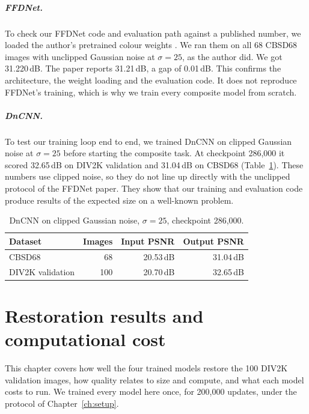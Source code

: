 \documentclass[12pt,a4paper,oneside]{NITR}
\newcommand{\dB}{\,dB}
\begin{document}
\paragraph{FFDNet.} To check our FFDNet code and evaluation path against a
published number, we loaded the author's pretrained colour weights
\cite{kair}. We ran them on all 68 CBSD68 images \cite{martin2001bsd} with
unclipped Gaussian noise at $\sigma=25$, as the author did. We got
31.220\dB{}. The paper \cite{zhang2018ffdnet} reports 31.21\dB{}, a gap of
0.01\dB{}. This confirms the architecture, the weight loading and the
evaluation code. It does not reproduce FFDNet's training, which is why we
train every composite model from scratch.

\paragraph{DnCNN.} To test our training loop end to end, we trained DnCNN on
clipped Gaussian noise at $\sigma=25$ before starting the composite task. At
checkpoint 286,000 it scored 32.65\dB{} on DIV2K validation and 31.04\dB{} on
CBSD68 (Table~\ref{tab:gaussian}). These numbers use clipped noise, so they
do not line up directly with the unclipped protocol of the FFDNet paper. They
show that our training and evaluation code produce results of the expected
size on a well-known problem.

\begin{table}[htbp]
	\centering
	\caption{DnCNN on clipped Gaussian noise, $\sigma=25$, checkpoint 286,000.}
	\label{tab:gaussian}
	\begin{tabular}{@{}lrrr@{}}
		\toprule
		Dataset & Images & Input PSNR & Output PSNR \\
		\midrule
		CBSD68           & 68  & 20.53\dB & 31.04\dB \\
		DIV2K validation & 100 & 20.70\dB & 32.65\dB \\
		\bottomrule
	\end{tabular}
\end{table}

\thispagestyle{empty}\cleardoublepage
\chapter{Restoration results and computational cost}\label{ch:results}

This chapter covers how well the four trained models restore the 100 DIV2K
validation images, how quality relates to size and compute, and what each
model costs to run. We trained every model here once, for 200,000 updates,
under the protocol of Chapter~\ref{ch:setup}.
\end{document}
